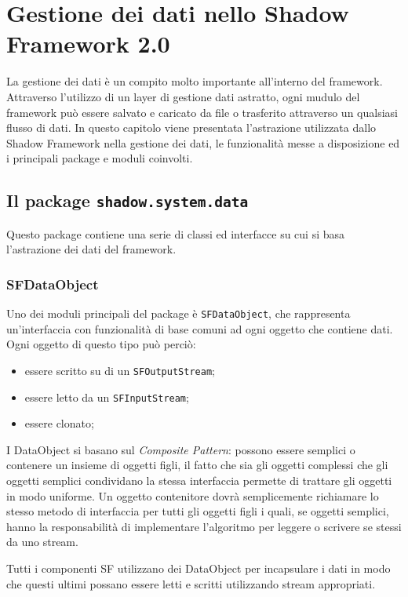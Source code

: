 
\chapter{Gestione dei dati nello Shadow Framework 2.0}
\label{ch:gestionedati}

La gestione dei dati è un compito molto importante all'interno del framework. Attraverso l'utilizzo di un layer di gestione dati astratto, ogni mudulo del framework può essere salvato e caricato da file o trasferito attraverso un qualsiasi flusso di dati.
In questo capitolo viene presentata l'astrazione utilizzata dallo Shadow Framework nella gestione dei dati, le funzionalità messe a disposizione ed i principali package e moduli coinvolti.

\section{Il package \texttt{shadow.system.data}}
\label{sub:shadow_system_data}
Questo package contiene una serie di classi ed interfacce su cui si basa l'astrazione dei dati del framework.

\subsection{SFDataObject}
\label{sub:sfdataobject}
Uno dei moduli principali del package \`e \texttt{SFDataObject}, che rappresenta un'interfaccia con funzionalit\`a di base comuni ad ogni oggetto che contiene dati. 
Ogni oggetto di questo tipo pu\`o perci\`o:
\begin{itemize}
	\item essere scritto su di un \texttt{SFOutputStream};
	\item essere letto da un \texttt{SFInputStream};
	\item essere clonato;
\end{itemize}
I DataObject si basano sul \textit{Composite Pattern}: possono essere semplici o contenere un insieme di oggetti figli, il fatto che sia gli oggetti complessi che gli oggetti semplici condividano la stessa interfaccia permette di trattare gli oggetti in modo uniforme. Un oggetto contenitore dovr\`a semplicemente richiamare lo stesso metodo di interfaccia per tutti gli oggetti figli i quali, se oggetti semplici, hanno la responsabilit\`a di implementare l'algoritmo per leggere o scrivere se stessi da uno stream.

Tutti i componenti SF utilizzano dei DataObject per incapsulare i dati in modo che questi ultimi possano essere letti e scritti utilizzando stream appropriati.

